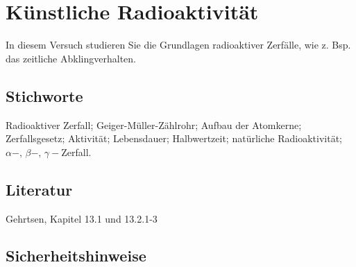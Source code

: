 \chapter{Künstliche Radioaktivität}
\label{v:19}


In diesem Versuch studieren Sie die Grundlagen radioaktiver Zerfälle, wie z. Bsp. das zeitliche Abklingverhalten.

\section{Stichworte}

Radioaktiver Zerfall; Geiger-Müller-Zählrohr; Aufbau der Atomkerne; Zerfallsgesetz; Aktivität; Lebensdauer; Halbwertzeit; natürliche Radioaktivität; $\alpha-,\,\beta-,\,\gamma-$Zerfall.
%
\section{Literatur}

Gehrtsen, Kapitel 13.1 und 13.2.1-3
%
\section{Sicherheitshinweise}

